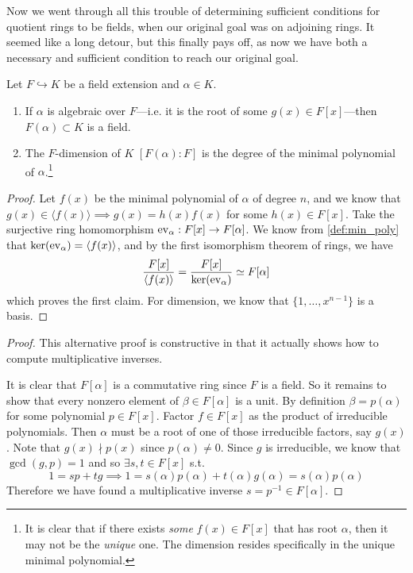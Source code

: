   Now we went through all this trouble of determining sufficient conditions for quotient rings to be fields, when our original goal was on adjoining rings. It seemed like a long detour, but this finally pays off, as now we have both a necessary and sufficient condition to reach our original goal. 

  \begin{corollary}
    Let $F \hookrightarrow K$ be a field extension and $\alpha \in K$. 
    \begin{enumerate}
      \item If $\alpha$ is algebraic over $F$---i.e. it is the root of some $g(x) \in F[x]$---then $F(\alpha) \subset K$ is a field. 
      \item The $F$-dimension of $K$ $[F(\alpha):F]$ is the degree of the minimal polynomial of $\alpha$.\footnote{It is clear that if there exists \textit{some} $f(x) \in F[x]$ that has root $\alpha$, then it may not be the \textit{unique} one. The dimension resides specifically in the unique minimal polynomial. } 
    \end{enumerate}
  \end{corollary}
  \begin{proof} 
    Let $f(x)$ be the minimal polynomial of $\alpha$ of degree $n$, and we know that $g(x) \in \langle f(x) \rangle \implies g(x) = h(x) f(x)$ for some $h(x) \in F[x]$. Take the surjective ring homomorphism $\ev_\alpha: F[x] \to F[\alpha]$. We know from \ref{def:min_poly} that $\ker(\ev_\alpha) = \langle f(x) \rangle$, and by the first isomorphism theorem of rings, we have 
    \begin{equation}
      \frac{F[x]}{\langle f(x) \rangle} = \frac{F[x]}{\ker(\ev_\alpha)} \simeq F[\alpha]
    \end{equation} 
    which proves the first claim. For dimension, we know that $\{1, \ldots, x^{n-1}\}$ is a basis. 
  \end{proof}
  \begin{proof}
    This alternative proof is constructive in that it actually shows how to compute multiplicative inverses. 

    It is clear that $F[\alpha]$ is a commutative ring since $F$ is a field. So it remains to show that every nonzero element of $\beta \in F[\alpha]$ is a unit. By definition $\beta = p(\alpha)$ for some polynomial $p \in F[x]$. Factor $f \in F[x]$ as the product of irreducible polynomials. Then $\alpha$ must be a root of one of those irreducible factors, say $g(x)$. Note that $g(x) \nmid p(x)$ since $p(\alpha) \neq 0$. Since $g$ is irreducible, we know that $\gcd(g, p) = 1$ and so $\exists s, t \in F[x]$ s.t. 
    \begin{equation}
      1 = s p + t g \implies 1 = s(\alpha) p(\alpha) + t(\alpha) g(\alpha) = s(\alpha) p(\alpha)
    \end{equation}  
    Therefore we have found a multiplicative inverse $s = p^{-1} \in F[\alpha]$. 
  \end{proof} 
